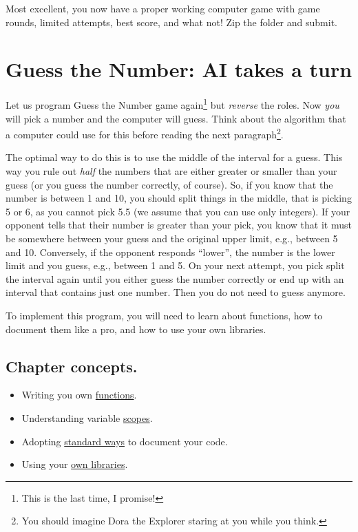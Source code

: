 \documentclass[
]{book}
\providecommand{\tightlist}{%
  \setlength{\itemsep}{0pt}\setlength{\parskip}{0pt}}
\begin{document}
Most excellent, you now have a proper working computer game with game rounds, limited attempts, best score, and what not! Zip the folder and submit.

\hypertarget{guess-the-number-ai}{%
\chapter{Guess the Number: AI takes a turn}\label{guess-the-number-ai}}

Let us program Guess the Number game again\footnote{This is the last time, I promise!} but \emph{reverse} the roles. Now \emph{you} will pick a number and the computer will guess. Think about the algorithm that a computer could use for this before reading the next paragraph\footnote{You should imagine Dora the Explorer staring at you while you think.}.

The optimal way to do this is to use the middle of the interval for a guess. This way you rule out \emph{half} the numbers that are either greater or smaller than your guess (or you guess the number correctly, of course). So, if you know that the number is between 1 and 10, you should split things in the middle, that is picking 5 or 6, as you cannot pick 5.5 (we assume that you can use only integers). If your opponent tells that their number is greater than your pick, you know that it must be somewhere between your guess and the original upper limit, e.g., between 5 and 10. Conversely, if the opponent responds ``lower'', the number is the lower limit and you guess, e.g., between 1 and 5. On your next attempt, you pick split the interval again until you either guess the number correctly or end up with an interval that contains just one number. Then you do not need to guess anymore.

To implement this program, you will need to learn about functions, how to document them like a pro, and how to use your own libraries.

\hypertarget{chapter-concepts.}{%
\section{Chapter concepts.}\label{chapter-concepts.}}

\begin{itemize}
\tightlist
\item
  Writing you own \protect\hyperlink{function}{functions}.
\item
  Understanding variable \protect\hyperlink{scopes-for-immutable-values}{scopes}.
\item
  Adopting \protect\hyperlink{numpy-docstring}{standard ways} to document your code.
\item
  Using your \protect\hyperlink{using-you-own-libraries}{own libraries}.
\end{itemize}
\end{document}

